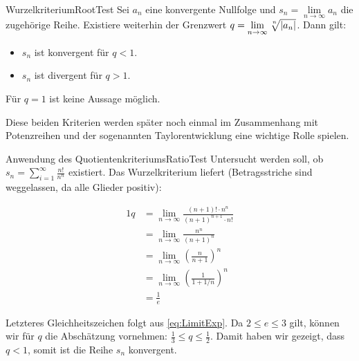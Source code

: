 \begin{statement}{Wurzelkriterium}{RootTest}
    Sei $a_n$ eine konvergente Nullfolge und $s_n = \lim\limits_{n\to\infty} a_n$ die zugehörige Reihe. Existiere weiterhin der Grenzwert $q = \lim\limits_{n\to\infty} \nroot{n}{|a_n|}$. Dann gilt:

    \begin{itemize}
        \item $s_n$ ist konvergent für $q < 1$.
        \item $s_n$ ist divergent für $q > 1$.
    \end{itemize}

    Für $q=1$ ist keine Aussage möglich.
\end{statement}

Diese beiden Kriterien werden später noch einmal im Zusammenhang mit Potenzreihen und der sogenannten Taylorentwicklung eine wichtige Rolle spielen.

\begin{example}{Anwendung des Quotientenkriteriums}{RatioTest}
    Untersucht werden soll, ob $s_n = \sum\limits_{i=1}^\infty \frac{n!}{n^n}$ existiert. Das Wurzelkriterium liefert (Betragsstriche sind weggelassen, da alle Glieder positiv):

    \begin{alignat*}{1}
        q &= \lim\limits_{n\to\infty} \frac{(n+1)! \cdot n^n}{(n+1)^{n+1} \cdot n!} \\
          &= \lim\limits_{n\to\infty} \frac{n^n}{(n+1)^n} \\
          &= \lim\limits_{n\to\infty} \left(\frac{n}{n+1}\right)^n \\
          &= \lim\limits_{n\to\infty} \left( \frac{1}{1+1/n} \right)^n \\
          &= \frac{1}{e}
    \end{alignat*}

    Letzteres Gleichheitszeichen folgt aus \ref{eq:LimitExp}. Da $2\le e \le 3$ gilt, können wir für $q$ die Abschätzung vornehmen: $\frac{1}{3} \le q \le \frac{1}{2}$. Damit haben wir gezeigt, dass $q < 1$, somit ist die Reihe $s_n$ konvergent.
\end{example}
